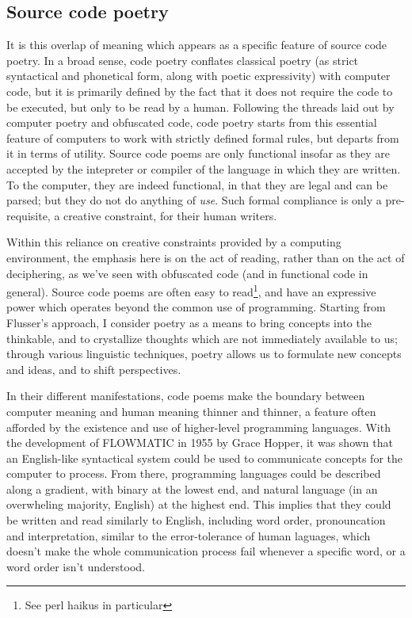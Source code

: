 \documentclass{article}
\begin{document}
\vspace{1\baselineskip}

\subsection{Source code poetry}

It is this overlap of meaning which appears as a specific feature of source code poetry. In a broad sense, code poetry conflates classical poetry (as strict syntactical and phonetical form, along with poetic expressivity) with computer code, but it is primarily defined by the fact that it does not require the code to be executed, but only to be read by a human. Following the threads laid out by computer poetry and obfuscated code, code poetry starts from this essential feature of computers to work with strictly defined formal rules, but departs from it in terms of utility. Source code poems are only functional insofar as they are accepted by the intepreter or compiler of the language in which they are written. To the computer, they are indeed functional, in that they are legal and can be parsed; but they do not do anything of \emph{use}. Such formal compliance is only a pre-requisite, a creative constraint, for their human writers.

Within this reliance on creative constraints provided by a computing environment, the emphasis here is on the act of reading, rather than on the act of deciphering, as we've seen with obfuscated code (and in functional code in general). Source code poems are often easy to read\footnote{See perl haikus in particular}, and have an expressive power which operates beyond the common use of programming. Starting from Flusser's approach, I consider poetry as a means to bring concepts into the thinkable, and to crystallize thoughts which are not immediately available to us\cite{flusser_doubt_2014}; through various linguistic techniques, poetry allows us to formulate new concepts and ideas, and to shift perspectives.

In their different manifestations, code poems make the boundary between computer meaning and human meaning thinner and thinner, a feature often afforded by the existence and use of higher-level programming languages. With the development of FLOWMATIC in 1955 by Grace Hopper, it was shown that an English-like syntactical system could be used to communicate concepts for the computer to process. From there, programming languages could be described along a gradient, with binary at the lowest end, and natural language (in an overwheling majority, English) at the highest end. This implies that they could be written and read similarly to English, including word order, pronouncation and interpretation, similar to the error-tolerance of human laguages, which doesn't make the whole communication process fail whenever a specific word, or a word order isn't understood.
\end{document}
